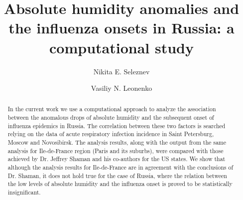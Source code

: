 \documentclass[3p,times,procedia]{elsarticle}
\begin{document}
\begin{frontmatter}



%

\title{Absolute humidity anomalies and the influenza onsets in Russia: a computational study}



\author[a]{Nikita E. Seleznev}
\author[a]{Vasiliy N. Leonenko}

\address[a]{ITMO University, 49 Kronverksky Pr.
  Saint-Petersburg, 197101, Russia }

\begin{abstract}
In the current work we use a computational approach to analyze the association between the anomalous drops of absolute humidity and the subsequent onset of influenza epidemics in Russia. The correlation between these two factors is searched relying on the data of acute respiratory infection incidence in Saint Petersburg, Moscow and Novosibirsk. The analysis results, along with the output from the same analysis for Ile-de-France region (Paris and its suburbs), were compared with those achieved by Dr. Jeffrey Shaman and his co-authors for the US states. We show that although the analysis results for Ile-de-France are in agreement with the conclusions of Dr. Shaman, it does not hold true for the case of Russia, where the relation between the low levels of absolute humidity and the influenza onset is proved to be statistically insignificant.
\end{abstract}


\end{frontmatter}
\end{document}
